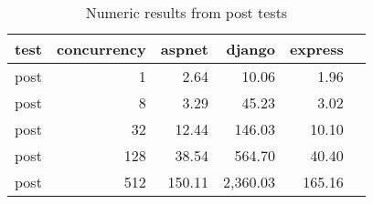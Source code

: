 \FloatBarrier
\begin{table}[!htp]\centering
    \caption{Numeric results from post tests}\label{tab:resultsPost}
    \scriptsize
    \begin{tabular}{lrrrrr}\toprule
        test & concurrency & aspnet & django   & express \\\midrule
        post & 1           & 2.64   & 10.06    & 1.96    \\
        post & 8           & 3.29   & 45.23    & 3.02    \\
        post & 32          & 12.44  & 146.03   & 10.10   \\
        post & 128         & 38.54  & 564.70   & 40.40   \\
        post & 512         & 150.11 & 2,360.03 & 165.16  \\
        \bottomrule
    \end{tabular}
\end{table}
\FloatBarrier
